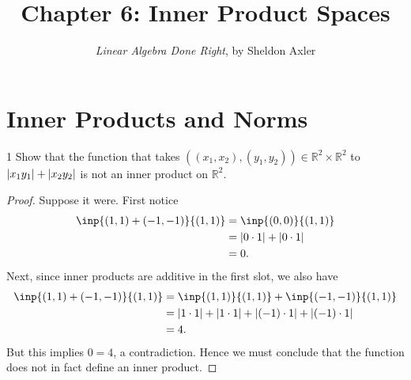 \documentclass{extarticle}
\title{\vspace{-2em}Chapter 6: Inner Product Spaces}
\author{\emph{Linear Algebra Done Right}, by Sheldon Axler}
\date{}
\newenvironment{problem}[1]{\begin{prob*}{#1}{}}{\end{prob*}}
\newcommand{\R}{\mathbb{R}}
\DeclarePairedDelimiter\Mod{\lvert}{\rvert}
\begin{document}
\maketitle



\section{Inner Products and Norms}

\begin{problem}{1}
Show that the function that takes $\left((x_1,x_2), (y_1,y_2)\right)\in \R^2\times \R^2$ to $\Mod{x_1y_1} + \Mod{x_2y_2}$ is not an inner product on $\R^2$.
\end{problem}
\begin{proof}
Suppose it were.  First notice
\begin{align*}
\inp{(1, 1) + (-1, -1)}{(1, 1)} &= \inp{(0, 0)}{(1, 1)}\\
&= \Mod{0\cdot 1} + \Mod{0\cdot 1}\\
&= 0.
\end{align*}
Next, since inner products are additive in the first slot, we also have
\begin{align*}
\inp{(1, 1) + (-1, -1)}{(1, 1)} &= \inp{(1, 1)}{(1, 1)} + \inp{(-1, -1)}{(1, 1)}\\
&= \Mod{1\cdot 1} + \Mod{1 \cdot 1} + \Mod{(-1)\cdot 1} + \Mod{(-1) \cdot 1}\\
&= 4.
\end{align*}
But this implies $0 = 4$, a contradiction.  Hence we must conclude that the function does not in fact define an inner product.
\end{proof}
\end{document}
